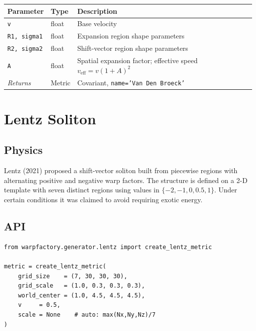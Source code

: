 \documentclass[11pt, a4paper, twoside]{report}
\begin{document}
\begin{center}
\begin{tabularx}{\linewidth}{llX}
  \toprule
  Parameter & Type & Description \\
  \midrule
  \texttt{v}      & float & Base velocity \\
  \texttt{R1, sigma1} & float & Expansion region shape parameters \\
  \texttt{R2, sigma2} & float & Shift-vector region shape parameters \\
  \texttt{A}      & float & Spatial expansion factor; effective speed
                            $v_\text{eff} = v(1+A)^2$ \\
  \midrule
  \emph{Returns}  & Metric & Covariant, \texttt{name='Van Den Broeck'} \\
  \bottomrule
\end{tabularx}
\end{center}

\section{Lentz Soliton}
\label{sec:lentz}

\subsection{Physics}

Lentz (2021) proposed a shift-vector soliton built from piecewise
regions with alternating positive and negative warp factors.  The
structure is defined on a 2-D template with seven distinct regions
using values in $\{-2,-1,0,0.5,1\}$.  Under certain conditions it
was claimed to avoid requiring exotic energy.

\subsection{API}

\begin{lstlisting}[caption={Lentz soliton metric}]
from warpfactory.generator.lentz import create_lentz_metric

metric = create_lentz_metric(
    grid_size    = (7, 30, 30, 30),
    grid_scale   = (1.0, 0.3, 0.3, 0.3),
    world_center = (1.0, 4.5, 4.5, 4.5),
    v     = 0.5,
    scale = None    # auto: max(Nx,Ny,Nz)/7
)
\end{lstlisting}
\end{document}
